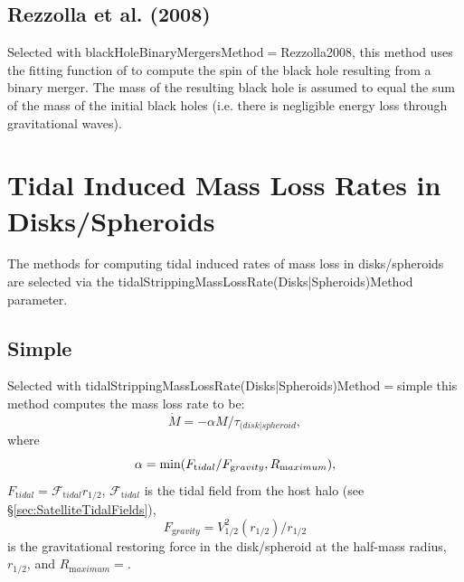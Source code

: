 \subsection{Rezzolla et al. (2008)}

Selected with {\normalfont \ttfamily blackHoleBinaryMergersMethod}$=${\normalfont \ttfamily Rezzolla2008}, this method uses the fitting function of \cite{rezzolla_final_2008} to compute the spin of the black hole resulting from a binary merger. The mass of the resulting black hole is assumed to equal the sum of the mass of the initial black holes (i.e. there is negligible energy loss through gravitational waves).

\section{Tidal Induced Mass Loss Rates in Disks/Spheroids}\label{sec:TidalMassLossRates}

The methods for computing tidal induced rates of mass loss in disks/spheroids are selected via the {\normalfont \ttfamily tidalStrippingMassLossRate(Disks|Spheroids)Method} parameter.

\subsection{Simple}

Selected with {\normalfont \ttfamily tidalStrippingMassLossRate(Disks|Spheroids)Method}$=${\normalfont \ttfamily simple} this method computes the mass loss rate to be:
\begin{equation}
\dot{M} = -\alpha M/\tau_{\mathrm (disk|spheroid},
\end{equation}
where
\begin{equation}
\alpha = \hbox{min}(F_{\mathrm tidal}/F_{\mathrm gravity},R_{\mathrm maximum}),
\end{equation}
$F_{\mathrm tidal}=\mathcal{F}_{\mathrm tidal} r_{1/2}$, $\mathcal{F}_{\mathrm tidal}$ is the tidal field from the host halo (see \S\ref{sec:SatelliteTidalFields}),
\begin{equation}
F_{\mathrm gravity} = V_{1/2}^2(r_{1/2})/r_{1/2}
\end{equation}
is the gravitational restoring force in the disk/spheroid at the half-mass radius, $r_{\mathrm 1/2}$, and $R_{\mathrm maximum}=${\normalfont {}}.

